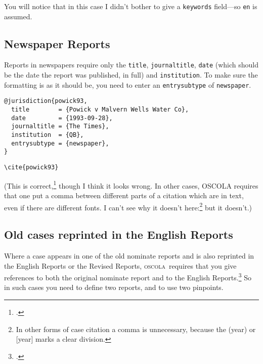 \documentclass[a5paper,fontsize=9pt,DIV=1]{scrartcl}
\newcommand{\oscolashort}{\textsc{oscola}\nocite{oscola}}
\newcounter{egcounter}\setcounter{egcounter}{0}
\newenvironment{bibexample}[1][]{%
  \medskip\par\small\noindent\ignorespaces
  \marginpar{[\refstepcounter{egcounter}\arabic{egcounter}]\label{#1}}
  \begin{minipage}[t]{0.95\linewidth}}
 {\end{minipage}\par\medskip}
\newcommand{\egcite}[1]{\texttt{\textbackslash cite#1}}
\begin{document}
You will notice that in this case I didn't bother to give a
\texttt{keywords} field---so \texttt{en} is assumed.

\subsection{Newspaper Reports}

Reports in newspapers require only the \texttt{title},
\texttt{journaltitle}, \texttt{date} (which should be the date the
report was published, in full) and \texttt{institution}. To make sure
the formatting is as it should be, you need to enter an \texttt{entrysubtype} of \texttt{newspaper}.

\begin{bibexample}[powick93]
\begin{verbatim}
@jurisdiction{powick93,
  title        = {Powick v Malvern Wells Water Co},
  date         = {1993-09-28},
  journaltitle = {The Times},
  institution  = {QB},
  entrysubtype = {newspaper},
}
\end{verbatim}
\end{bibexample}

\begin{description}
\item[\egcite{\{powick93\}}] \cite{powick93}
\end{description}
\noindent
(This is correct,\footcite[See][18]{oscola} though I
think it looks wrong. In other cases, OSCOLA requires that one put a
comma between different parts of a citation which are in text, even if
there are different fonts. I can't see why it doesn't
here:\footnote{In other forms of case citation a comma is unnecessary,
  because the (year) or [year] marks a clear division.} but it
doesn't.)

\subsection{Old cases reprinted in the English Reports\label{parallel:reports}}


Where a case appears in one of the old nominate reports and is also
reprinted in the English Reports or the Revised Reports, \oscolashort\
requires that you give references to both the original nominate report
and to the English Reports.\footcite[20--21]{oscola} So in such cases
you need to define two reports, and to use two pinpoints.
\end{document}
